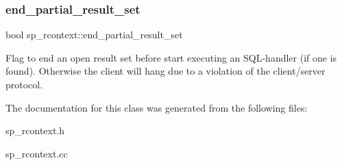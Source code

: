 \subsubsection{\texorpdfstring{end\+\_\+partial\+\_\+result\+\_\+set}{end\_partial\_result\_set}}
{\footnotesize\ttfamily bool sp\+\_\+rcontext\+::end\+\_\+partial\+\_\+result\+\_\+set}

Flag to end an open result set before start executing an S\+QL-\/handler (if one is found). Otherwise the client will hang due to a violation of the client/server protocol. 

The documentation for this class was generated from the following files\+:\begin{DoxyCompactItemize}
\item 
sp\+\_\+rcontext.\+h\item 
sp\+\_\+rcontext.\+cc\end{DoxyCompactItemize}
